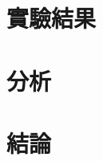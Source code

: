 \documentclass[12pt, a4paper, oneside]{ctexbook}
\begin{document}
\chapter{實驗結果}
\label{sec:results}


\chapter{分析}
\label{sec:analysis}


\chapter{結論}
\label{sec:conclusion}


\cleardoublepage
{}



\appendix

\end{document}
